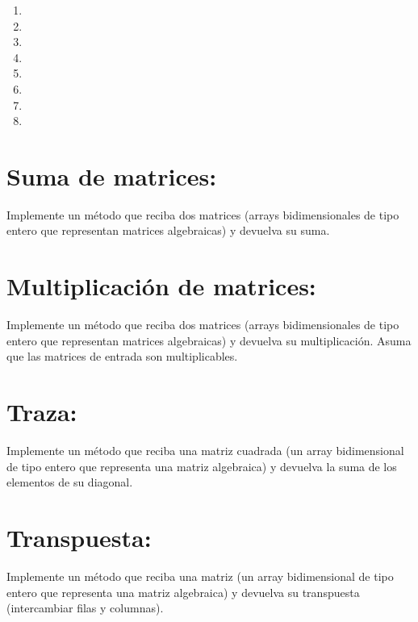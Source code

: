 \begin{enumerate}
    \item
    

    \item
    

    \item
    
    
    \item
    

    \item
    

    \item
    

    \item
    

    \item
    
\end{enumerate}

\section{Suma de matrices:}  
Implemente un método que reciba dos matrices (arrays bidimensionales de tipo entero que representan matrices algebraicas) y devuelva su suma.

\section{Multiplicación de matrices:}  
Implemente un método que reciba dos matrices (arrays bidimensionales de tipo entero que representan matrices algebraicas) y devuelva su multiplicación. Asuma que las matrices de entrada son multiplicables.

\section{Traza:}  
Implemente un método que reciba una matriz cuadrada (un array bidimensional de tipo entero que representa una matriz algebraica) y devuelva la suma de los elementos de su diagonal.

\section{Transpuesta:}  
Implemente un método que reciba una matriz (un array bidimensional de tipo entero que representa una matriz algebraica) y devuelva su transpuesta (intercambiar filas y columnas).

